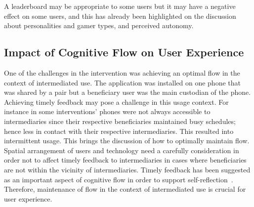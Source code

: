 A leaderboard may be appropriate to some users but it may have a negative effect on some users, and this has already been highlighted on the discussion about personalities and gamer types, and perceived autonomy. 

\subsection{Impact of Cognitive Flow on User Experience}
One of the challenges in the intervention was achieving an optimal flow in the context of intermediated use. The application was installed on one phone that was shared by a pair but a beneficiary user was the main custodian of the phone. Achieving timely feedback may pose a challenge in this usage context. For instance in some interventions' phones were not always accessible  to intermediaries since their respective beneficiaries maintained busy schedules; hence less in contact with their respective intermediaries. This resulted into intermittent usage. This brings the discussion of how to optimally maintain flow. Spatial arrangement of users and technology need a carefully consideration in order not to affect timely feedback to intermediaries in cases where beneficiaries are not within the vicinity of intermediaries. Timely feedback  has been suggested as an important aspect of cognitive flow in order to support self-reflection~\citep{csikszentmihalyiflow}. Therefore, maintenance of flow in the context of intermediated use is crucial for user experience. 
\begin{flushright}
\end{flushright}

